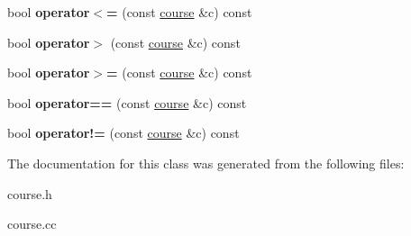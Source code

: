 \begin{DoxyCompactItemize}
\item 
bool {\bfseries operator$<$=} (const \hyperlink{classcourse}{course} \&c) const \hypertarget{classcourse_a6416d3083ef57cca7ed77f260f48dc11}{}\label{classcourse_a6416d3083ef57cca7ed77f260f48dc11}

\item 
bool {\bfseries operator$>$} (const \hyperlink{classcourse}{course} \&c) const \hypertarget{classcourse_a3d4e2681ba4f3ada21b2375129dbdae6}{}\label{classcourse_a3d4e2681ba4f3ada21b2375129dbdae6}

\item 
bool {\bfseries operator$>$=} (const \hyperlink{classcourse}{course} \&c) const \hypertarget{classcourse_a3ca9c58c57cb82c195656648ee0dacab}{}\label{classcourse_a3ca9c58c57cb82c195656648ee0dacab}

\item 
bool {\bfseries operator==} (const \hyperlink{classcourse}{course} \&c) const \hypertarget{classcourse_a9902543488788e4d53cd4614ed52ad25}{}\label{classcourse_a9902543488788e4d53cd4614ed52ad25}

\item 
bool {\bfseries operator!=} (const \hyperlink{classcourse}{course} \&c) const \hypertarget{classcourse_a7e598f9d46bd8ac668c2f3429f065446}{}\label{classcourse_a7e598f9d46bd8ac668c2f3429f065446}

\end{DoxyCompactItemize}


The documentation for this class was generated from the following files\+:\begin{DoxyCompactItemize}
\item 
course.\+h\item 
course.\+cc\end{DoxyCompactItemize}
